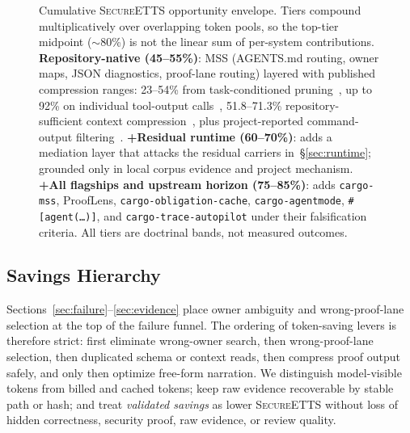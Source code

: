 \documentclass[conference]{IEEEtran}
\newcommand{\secureetts}{\textnormal{\textsc{SecureETTS}}}
\newcommand{\mss}{\textnormal{\textsc{MSS}}}
\begin{document}
\begin{figure}[!t]
\caption{Cumulative \secureetts{} opportunity envelope. Tiers compound multiplicatively over overlapping token pools, so the top-tier midpoint ($\sim$80\%) is not the linear sum of per-system contributions. \textbf{Repository-native (45--55\%)}: \mss{} (AGENTS.md routing, owner maps, JSON diagnostics, proof-lane routing) layered with published compression ranges: 23--54\% from task-conditioned pruning~\cite{swePruner2026}, up to 92\% on individual tool-output calls~\cite{squeez2026}, 51.8--71.3\% repository-sufficient context compression~\cite{compressingCodeContext2026}, plus project-reported command-output filtering~\cite{rtk2026}. \textbf{+Residual runtime (60--70\%)}: adds a mediation layer that attacks the residual carriers in~\S\ref{sec:runtime}; grounded only in local corpus evidence and project mechanism. \textbf{+All flagships and upstream horizon (75--85\%)}: adds \texttt{cargo-mss}, ProofLens, \texttt{cargo-obligation-cache}, \texttt{cargo-agentmode}, \texttt{\#[agent(\ldots)]}, and \texttt{cargo-trace-autopilot} under their falsification criteria. All tiers are doctrinal bands, not measured outcomes.}
\label{fig:envelope}
\end{figure}

\subsection{Savings Hierarchy}
Sections~\ref{sec:failure}--\ref{sec:evidence} place owner ambiguity and wrong-proof-lane selection at the top of the failure funnel. The ordering of token-saving levers is therefore strict: first eliminate wrong-owner search, then wrong-proof-lane selection, then duplicated schema or context reads, then compress proof output safely, and only then optimize free-form narration. We distinguish model-visible tokens from billed and cached tokens; keep raw evidence recoverable by stable path or hash; and treat \emph{validated savings} as lower \secureetts{} without loss of hidden correctness, security proof, raw evidence, or review quality.
\end{document}
